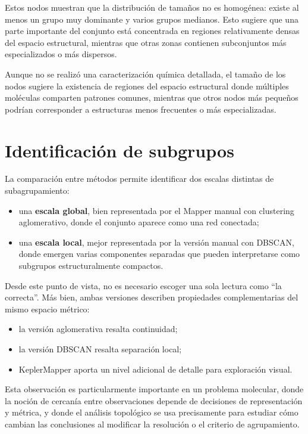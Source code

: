 \documentclass[12pt]{article}
\begin{document}
Estos nodos muestran que la distribuci\'on de tama\~nos no es homog\'enea: existe al menos un grupo muy dominante y varios grupos medianos. Esto sugiere que una parte importante del conjunto est\'a concentrada en regiones relativamente densas del espacio estructural, mientras que otras zonas contienen subconjuntos m\'as especializados o m\'as dispersos.


Aunque no se realizó una caracterización química detallada, el tamaño de los nodos sugiere la existencia de regiones del espacio estructural donde múltiples moléculas comparten patrones comunes, mientras que otros nodos más pequeños podrían corresponder a estructuras menos frecuentes o más especializadas.

\section{Identificaci\'on de subgrupos}

La comparaci\'on entre m\'etodos permite identificar dos escalas distintas de subagrupamiento:

\begin{itemize}
    \item una \textbf{escala global}, bien representada por el Mapper manual con clustering aglomerativo, donde el conjunto aparece como una red conectada;
    \item una \textbf{escala local}, mejor representada por la versi\'on manual con DBSCAN, donde emergen varias componentes separadas que pueden interpretarse como subgrupos estructuralmente compactos.
\end{itemize}

Desde este punto de vista, no es necesario escoger una sola lectura como ``la correcta''. M\'as bien, ambas versiones describen propiedades complementarias del mismo espacio m\'etrico:

\begin{itemize}
    \item la versi\'on aglomerativa resalta continuidad;
    \item la versi\'on DBSCAN resalta separaci\'on local;
    \item KeplerMapper aporta un nivel adicional de detalle para exploraci\'on visual.
\end{itemize}

Esta observaci\'on es particularmente importante en un problema molecular, donde la noci\'on de cercan\'ia entre observaciones depende de decisiones de representaci\'on y m\'etrica, y donde el an\'alisis topol\'ogico se usa precisamente para estudiar c\'omo cambian las conclusiones al modificar la resoluci\'on o el criterio de agrupamiento.
\end{document}
